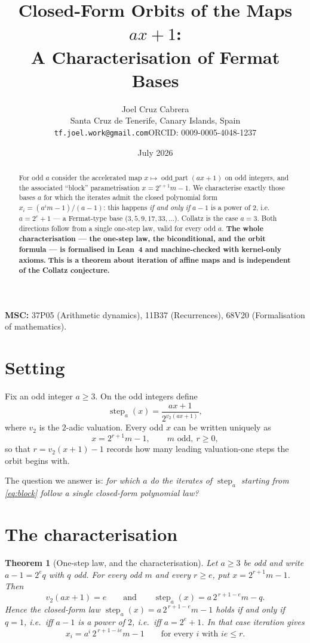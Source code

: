 \documentclass[11pt,a4paper]{article}
\title{\bfseries Closed-Form Orbits of the Maps $ax+1$:\\ A Characterisation of Fermat Bases}
\author{Joel Cruz Cabrera\\
\small Santa Cruz de Tenerife, Canary Islands, Spain\\
\small\texttt{tf.joel.work@gmail.com}\quad ORCID: 0009-0005-4048-1237}
\date{July 2026}
\theoremstyle{plain}
\newtheorem{theorem}{Theorem}[section]
\theoremstyle{definition}
\begin{document}
\maketitle

\begin{abstract}
For odd $a$ consider the accelerated map $x\mapsto\operatorname{odd\_part}(ax+1)$ on odd
integers, and the associated ``block'' parametrisation $x=2^{r+1}m-1$. We characterise
exactly those bases $a$ for which the iterates admit the closed polynomial form
$x_i=(a^i m-1)/(a-1)$: this happens \emph{if and only if} $a-1$ is a power of $2$, i.e.
$a=2^e+1$ --- a Fermat-type base ($3,5,9,17,33,\dots$). Collatz is the case $a=3$. Both
directions follow from a single one-step law, valid for every odd $a$. \textbf{The whole
characterisation --- the one-step law, the biconditional, and the orbit formula --- is
formalised in Lean~4 and machine-checked with kernel-only axioms.}
\textbf{This is a theorem about iteration of affine maps and is independent of the Collatz
conjecture.}
\end{abstract}

\noindent\textbf{MSC:} 37P05 (Arithmetic dynamics), 11B37 (Recurrences), 68V20
(Formalisation of mathematics).

\section{Setting}
Fix an odd integer $a\ge3$. On the odd integers define
\[
  \operatorname{step}_a(x)=\frac{ax+1}{2^{v_2(ax+1)}},
\]
where $v_2$ is the $2$-adic valuation. Every odd $x$ can be written uniquely as
\begin{equation}\label{eq:block}
  x=2^{r+1}m-1,\qquad m \text{ odd},\ r\ge0,
\end{equation}
so that $r=v_2(x+1)-1$ records how many leading valuation-one steps the orbit begins with.

The question we answer is: \emph{for which $a$ do the iterates of $\operatorname{step}_a$
starting from \eqref{eq:block} follow a single closed-form polynomial law?}

\section{The characterisation}

\begin{theorem}[One-step law, and the characterisation]\label{thm:main}
Let $a\ge3$ be odd and write $a-1=2^{e}q$ with $q$ odd. For every odd $m$ and every $r\ge e$,
put $x=2^{r+1}m-1$. Then
\begin{equation}\label{eq:onestep}
  v_2(ax+1)=e\qquad\text{and}\qquad \operatorname{step}_a(x)=a\,2^{\,r+1-e}m-q .
\end{equation}
Hence the closed-form law $\operatorname{step}_a(x)=a\,2^{\,r+1-e}m-1$ holds \emph{if and
only if} $q=1$, i.e.\ iff $a-1$ is a power of $2$, i.e.\ iff $a=2^{e}+1$. In that case
iteration gives
\begin{equation}\label{eq:cf}
  x_i=a^{i}\,2^{\,r+1-ie}m-1\qquad\text{for every }i\text{ with }ie\le r .
\end{equation}
\end{theorem}
\end{document}
